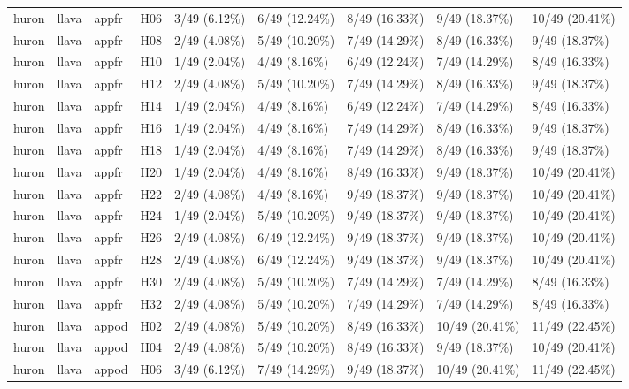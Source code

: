 \begin{longtable}{lllllllll}
huron & llava & appfr & H06 & 3/49 (6.12\%) & 6/49 (12.24\%) & 8/49 (16.33\%) & 9/49 (18.37\%) & 10/49 (20.41\%) \\
huron & llava & appfr & H08 & 2/49 (4.08\%) & 5/49 (10.20\%) & 7/49 (14.29\%) & 8/49 (16.33\%) & 9/49 (18.37\%) \\
huron & llava & appfr & H10 & 1/49 (2.04\%) & 4/49 (8.16\%) & 6/49 (12.24\%) & 7/49 (14.29\%) & 8/49 (16.33\%) \\
huron & llava & appfr & H12 & 2/49 (4.08\%) & 5/49 (10.20\%) & 7/49 (14.29\%) & 8/49 (16.33\%) & 9/49 (18.37\%) \\
huron & llava & appfr & H14 & 1/49 (2.04\%) & 4/49 (8.16\%) & 6/49 (12.24\%) & 7/49 (14.29\%) & 8/49 (16.33\%) \\
huron & llava & appfr & H16 & 1/49 (2.04\%) & 4/49 (8.16\%) & 7/49 (14.29\%) & 8/49 (16.33\%) & 9/49 (18.37\%) \\
huron & llava & appfr & H18 & 1/49 (2.04\%) & 4/49 (8.16\%) & 7/49 (14.29\%) & 8/49 (16.33\%) & 9/49 (18.37\%) \\
huron & llava & appfr & H20 & 1/49 (2.04\%) & 4/49 (8.16\%) & 8/49 (16.33\%) & 9/49 (18.37\%) & 10/49 (20.41\%) \\
huron & llava & appfr & H22 & 2/49 (4.08\%) & 4/49 (8.16\%) & 9/49 (18.37\%) & 9/49 (18.37\%) & 10/49 (20.41\%) \\
huron & llava & appfr & H24 & 1/49 (2.04\%) & 5/49 (10.20\%) & 9/49 (18.37\%) & 9/49 (18.37\%) & 10/49 (20.41\%) \\
huron & llava & appfr & H26 & 2/49 (4.08\%) & 6/49 (12.24\%) & 9/49 (18.37\%) & 9/49 (18.37\%) & 10/49 (20.41\%) \\
huron & llava & appfr & H28 & 2/49 (4.08\%) & 6/49 (12.24\%) & 9/49 (18.37\%) & 9/49 (18.37\%) & 10/49 (20.41\%) \\
huron & llava & appfr & H30 & 2/49 (4.08\%) & 5/49 (10.20\%) & 7/49 (14.29\%) & 7/49 (14.29\%) & 8/49 (16.33\%) \\
huron & llava & appfr & H32 & 2/49 (4.08\%) & 5/49 (10.20\%) & 7/49 (14.29\%) & 7/49 (14.29\%) & 8/49 (16.33\%) \\
huron & llava & appod & H02 & 2/49 (4.08\%) & 5/49 (10.20\%) & 8/49 (16.33\%) & 10/49 (20.41\%) & 11/49 (22.45\%) \\
huron & llava & appod & H04 & 2/49 (4.08\%) & 5/49 (10.20\%) & 8/49 (16.33\%) & 9/49 (18.37\%) & 10/49 (20.41\%) \\
huron & llava & appod & H06 & 3/49 (6.12\%) & 7/49 (14.29\%) & 9/49 (18.37\%) & 10/49 (20.41\%) & 11/49 (22.45\%) \\

\end{longtable}
